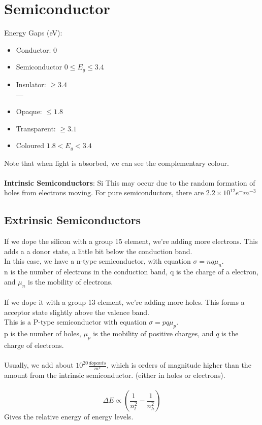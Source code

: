 \documentclass[10pt, twocolumn]{report}
\begin{document}
  \section{Semiconductor}
  Energy Gaps (eV):
  \begin{itemize}
    \item Conductor: $0$
    \item Semiconductor $0 \leq E_g \leq 3.4$
    \item Insulator: $\geq 3.4$ \\ ---
    \item Opaque: $\leq 1.8$
    \item Transparent: $\geq 3.1$
    \item Coloured $1.8 < E_g  < 3.4 $
  \end{itemize}

  Note that when light is absorbed, we can see the complementary colour.\\\\

  \textbf{Intrinsic Semiconductors}: Si
  This may occur due to the random formation of holes from electrons moving. For pure semiconductors, there are $2.2 \times 10^{12} e^- m^{-3}$

  \subsection{Extrinsic Semiconductors}
  If we dope the silicon with a group 15 element, we're adding more electrons. This adds a a donor state, a little bit below the conduction band. \\ In this case, we have a n-type semiconductor, with equation $\sigma = nq \mu_n$. \\ n is the number of electrons in the conduction band, q is the charge of a electron, and $\mu_n$ is the mobility of electrons.\\\\ If we dope it with a group 13 element, we're adding more holes. This forms a acceptor state slightly above the valence band.\\This is a P-type semiconductor with equation $\sigma = pq \mu_p$. \\ p is the number of holes, $\mu_p$ is the mobility of positive charges, and $q$ is the charge of electrons. \\\\ Usually, we add about $10^{20} \frac{dopants}{m^3}$, which is orders of magnitude higher than the amount from the intrinsic semiconductor. (either in holes or electrons).\\ \\ $$\Delta E \propto (\frac{1}{n_l^2} - \frac{1}{n_h^2})$$ Gives the relative energy of energy levels.
\end{document}
